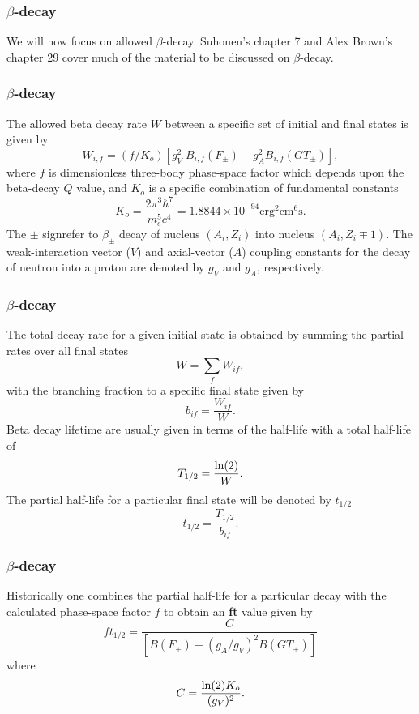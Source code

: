 \documentclass{beamer}
\begin{document}
\begin{frame}
\frametitle{$\beta$-decay}

\begin{block}{}
We will now focus on  allowed $\beta$-decay.  
Suhonen's chapter 7 and Alex Brown's chapter 29 cover much of the material to be discussed on $\beta$-decay. 
\end{block}
\end{frame}

\begin{frame}
\frametitle{$\beta$-decay}

\begin{block}{}
The allowed beta decay rate $W$ between a specific set of
initial and final states is given by
\[
W_{i,f} = (f/K_{o}) \left[ g_{V}^{2} \; B_{i,f}(F_{\pm})+ g_{A}^{2}B_{i,f}(GT_{\pm})\right], 
\]
where $f$ is dimensionless three-body
phase-space factor which depends upon the
beta-decay $Q$ value,
and $K_{o}$ is a specific combination of fundamental constants
\[
  K_{o}=\frac{2\pi^{3}\hbar^{7}}{ m_{e}^{5} c^{4}}= 1.8844 \times 10^{-94}\mathrm{erg}^{2}\mathrm{cm}^{6}\mathrm{s}. 
\]
The $\pm$ signrefer to $\beta_{\pm}$ decay of nucleus
$(A_{i},Z_{i})$ into nucleus $(A_{i},Z_{i} \mp 1)  $.
The weak-interaction vector ($V$) and axial-vector ($A$) coupling
constants for the decay of neutron into a proton are denoted by $g_{V}$
and $g_{A}$, respectively.
\end{block}
\end{frame}

\begin{frame}
\frametitle{$\beta$-decay}

\begin{block}{}
The total decay rate for a given
initial state is obtained by summing the partial rates over all
final states
\[
W = \displaystyle\sum _{f} W_{if}, 
\]
with the branching fraction to a specific final state given by
\[
b_{if} = \frac{W_{if}}{W}.  
\]
Beta decay lifetime are usually given in terms of the half-life with
a total half-life of
\[
T_{1/2} = \frac{{\rm ln}(2)}{W}.
\]
The partial half-life for a particular final state will be
denoted by $  t_{1/2}  $
\[
t_{1/2} = \frac{T_{1/2}}{b_{if}}. 
\]
\end{block}
\end{frame}

\begin{frame}
\frametitle{$\beta$-decay}

\begin{block}{}
Historically
one combines the partial half-life for a particular decay
with the calculated
phase-space factor $f$ to obtain  an \textbf{ft} value given by
\[
  f t_{1/2}=\frac{C }{\left[B(F_{\pm})+(g_{A}/g_{V})^{2} B(GT_{\pm}) \right] }  
\]
where
\[
  C = \frac{{\rm ln}(2)K_{o}}{(g_{V})^{2}}. 
\]
\end{block}
\end{frame}
\end{document}
